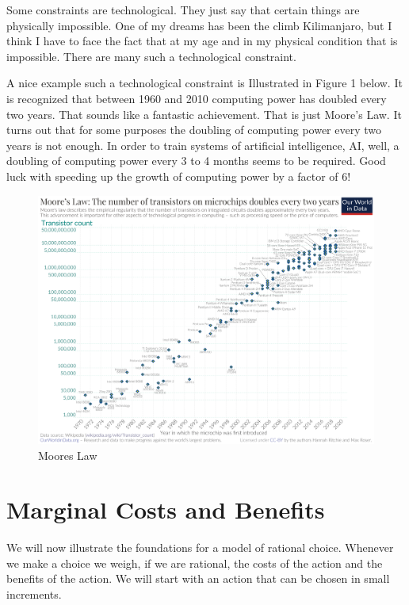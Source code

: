 \documentclass[
]{book}
\begin{document}
Some constraints are technological. They just say that certain things are physically impossible. One of my dreams has been the climb Kilimanjaro, but I think I have to face the fact that at my age and in my physical condition that is impossible. There are many such a technological constraint.

A nice example such a technological constraint is Illustrated in Figure 1 below. It is recognized that between 1960 and 2010 computing power has doubled every two years. That sounds like a fantastic achievement. That is just Moore's Law. It turns out that for some purposes the doubling of computing power every two years is not enough. In order to train systems of artificial intelligence, AI, well, a doubling of computing power every 3 to 4 months seems to be required. Good luck with speeding up the growth of computing power by a factor of 6!

\begin{figure}

{\centering \includegraphics[width=1\linewidth]{img/rationalchoice/moore} 

}

\caption{Moores Law}\label{fig:rationalchoice1}
\end{figure}

\hypertarget{marginal-costs-and-benefits}{%
\section{Marginal Costs and Benefits}\label{marginal-costs-and-benefits}}

We will now illustrate the foundations for a model of rational choice. Whenever we make a choice we weigh, if we are rational, the costs of the action and the benefits of the action. We will start with an action that can be chosen in small increments.
\end{document}
